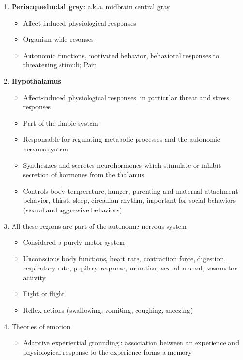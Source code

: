 \documentclass[12pt,letterpaper,table,svgnames,dvipsnames]{article}
\begin{document}
\begin{enumerate}
    \item \textbf{Periacqueductal gray}: a.k.a. midbrain central gray
        \begin{itemize}
            \item Affect-induced physiological responses
            \item Organism-wide resonses
            \item Autonomic functions, motivated behavior, behavioral responses to threatening stimuli; Pain
        \end{itemize}


    \item \textbf{Hypothalamus}
        \begin{itemize}
            \item Affect-induced physiological responses; in particular threat and stress responses
            \item Part of the limbic system
            \item Responsable for regulating metabolic processes and the autonomic nervous system
            \item Synthesizes and secretes neurohormones which stimulate or inhibit secretion of hormones from the thalamus
            \item Controls body temperature, hunger, parenting and maternal attachment behavior, thirst, sleep, circadian rhythm, important for social behaviors (sexual and aggressive behaviors)

        \end{itemize}

    \item All these regions are part of the autonomic nervous system
        \begin{itemize}
            \item Considered a purely motor system
            \item Unconscious body functions, heart rate, contraction force, digestion, respiratory rate, pupilary response, urination, sexual arousal, vasomotor activity
            \item Fight or flight
            \item Reflex actions (swallowing, vomiting, coughing, sneezing)
        \end{itemize}

    \item Theories of emotion

        \begin{itemize}
            \item Adaptive experiential grounding : association between an experience and physiological response to the experience forms a memory 


\end{itemize}
\end{enumerate}
\end{document}
